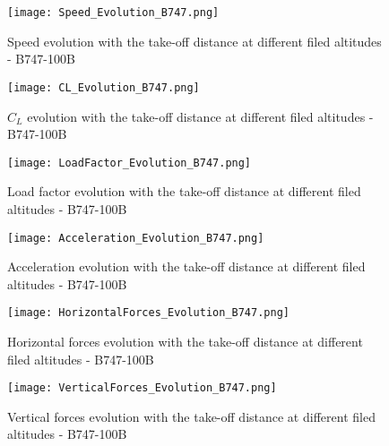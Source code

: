 %
%
\begin{figure}[H]
\centering
\texttt{[image: Speed\_Evolution\_B747.png]}
\caption{Speed evolution with the take-off distance at different filed altitudes - B747-100B}
\end{figure}
%
%
\begin{figure}[H]
\centering
\texttt{[image: CL\_Evolution\_B747.png]}
\caption{$C_L$ evolution with the take-off distance at different filed altitudes - B747-100B}
\end{figure}
%
%
\begin{figure}[H]
\centering
\texttt{[image: LoadFactor\_Evolution\_B747.png]}
\caption{Load factor evolution with the take-off distance at different filed altitudes - B747-100B}
\end{figure}
%
%
\begin{figure}[H]
\centering
\texttt{[image: Acceleration\_Evolution\_B747.png]}
\caption{Acceleration evolution with the take-off distance at different filed altitudes - B747-100B}
\end{figure}
%
%
\begin{figure}[H]
\centering
\texttt{[image: HorizontalForces\_Evolution\_B747.png]}
\caption{Horizontal forces evolution with the take-off distance at different filed altitudes - B747-100B}
\end{figure}
%
%
\begin{figure}[H]
\centering
\texttt{[image: VerticalForces\_Evolution\_B747.png]}
\caption{Vertical forces evolution with the take-off distance at different filed altitudes - B747-100B}
\end{figure}
%